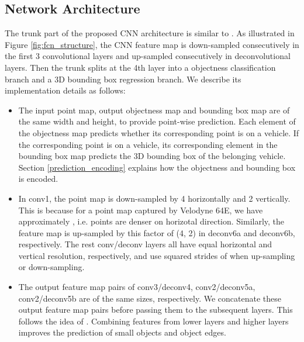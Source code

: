 \documentclass[conference]{IEEEtran}
\begin{document}
\subsection{Network Architecture}
\label{sec:network_architecture}

The trunk part of the proposed CNN architecture is similar to \citet{Huang2015, Long}. As illustrated in Figure \ref{fig:fcn_structure}, the CNN feature map is down-sampled consecutively in the first 3 convolutional layers and up-sampled consecutively in deconvolutional layers. Then the trunk splits at the 4th layer into a objectness classification branch and a 3D bounding box regression branch. We describe its implementation details as follows:
\begin{itemize}
\item The input point map, output objectness map and bounding box map are of the same width and height, to provide point-wise prediction. Each element of the objectness map predicts whether its corresponding point is on a vehicle. If the corresponding point is on a vehicle, its corresponding element in the bounding box map predicts the 3D bounding box of the belonging vehicle. Section \ref{prediction_encoding} explains how the objectness and bounding box is encoded.
\item In conv1, the point map is down-sampled by 4 horizontally and 2 vertically. This is because for a point map captured by Velodyne 64E, we have approximately , i.e. points are denser on horizotal direction. Similarly, the feature map is up-sampled by this factor of (4, 2) in deconv6a and deconv6b, respectively. The rest conv/deconv layers all have equal horizontal and vertical resolution, respectively, and use squared strides of  when up-sampling or down-sampling.
\item The output feature map pairs of conv3/deconv4, conv2/deconv5a, conv2/deconv5b are of the same sizes, respectively. We concatenate these output feature map pairs before passing them to the subsequent layers. This follows the idea of \citet{Long}. Combining features from lower layers and higher layers improves the prediction of small objects and object edges. 
\end{itemize}
\end{document}
